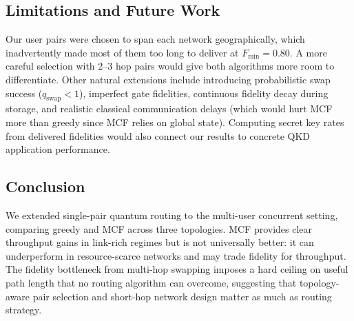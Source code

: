\subsection{Limitations and Future Work}

Our user pairs were chosen to span each network geographically, which inadvertently made most of them too long to deliver at $F_\text{min} = 0.80$. A more careful selection with 2--3 hop pairs would give both algorithms more room to differentiate. Other natural extensions include introducing probabilistic swap success ($q_\text{swap} < 1$), imperfect gate fidelities, continuous fidelity decay during storage, and realistic classical communication delays (which would hurt MCF more than greedy since MCF relies on global state). Computing secret key rates from delivered fidelities would also connect our results to concrete QKD application performance.

\subsection{Conclusion}

We extended single-pair quantum routing to the multi-user concurrent setting, comparing greedy and MCF across three topologies. MCF provides clear throughput gains in link-rich regimes but is not universally better: it can underperform in resource-scarce networks and may trade fidelity for throughput. The fidelity bottleneck from multi-hop swapping imposes a hard ceiling on useful path length that no routing algorithm can overcome, suggesting that topology-aware pair selection and short-hop network design matter as much as routing strategy.
